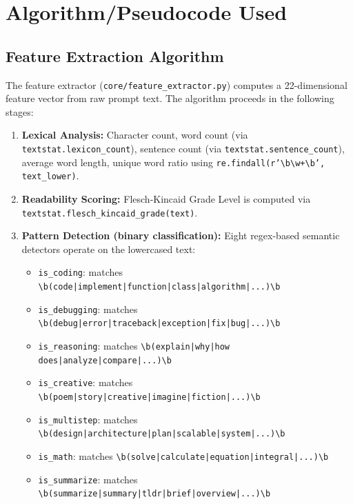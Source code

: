 \documentclass[12pt,a4paper]{report}
\begin{document}
\section{Algorithm/Pseudocode Used}

\subsection{Feature Extraction Algorithm}

The feature extractor (\texttt{core/feature\_extractor.py}) computes a 22-dimensional feature vector from raw prompt text. The algorithm proceeds in the following stages:

\begin{enumerate}[nosep]
    \item \textbf{Lexical Analysis:} Character count, word count (via \texttt{textstat.lexicon\_count}), sentence count (via \texttt{textstat.sentence\_count}), average word length, unique word ratio using \texttt{re.findall(r'\textbackslash b\textbackslash w+\textbackslash b', text\_lower)}.
    \item \textbf{Readability Scoring:} Flesch-Kincaid Grade Level is computed via \texttt{textstat.flesch\_kincaid\_grade(text)}.
    \item \textbf{Pattern Detection (binary classification):} Eight regex-based semantic detectors operate on the lowercased text:
    \begin{itemize}[nosep]
        \item \texttt{is\_coding}: matches \texttt{\textbackslash b(code|implement|function|class|algorithm|...)\textbackslash b}
        \item \texttt{is\_debugging}: matches \texttt{\textbackslash b(debug|error|traceback|exception|fix|bug|...)\textbackslash b}
        \item \texttt{is\_reasoning}: matches \texttt{\textbackslash b(explain|why|how does|analyze|compare|...)\textbackslash b}
        \item \texttt{is\_creative}: matches \texttt{\textbackslash b(poem|story|creative|imagine|fiction|...)\textbackslash b}
        \item \texttt{is\_multistep}: matches \texttt{\textbackslash b(design|architecture|plan|scalable|system|...)\textbackslash b}
        \item \texttt{is\_math}: matches \texttt{\textbackslash b(solve|calculate|equation|integral|...)\textbackslash b}
        \item \texttt{is\_summarize}: matches \texttt{\textbackslash b(summarize|summary|tldr|brief|overview|...)\textbackslash b}

\end{itemize}
\end{enumerate}
\end{document}
